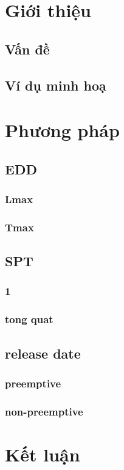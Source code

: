 \documentclass[12pt,a4paper]{report}
\begin{document}
\chapter{Giới thiệu}
\section{Vấn đề}
\section{Ví dụ minh hoạ}
\chapter{Phương pháp}
\section{EDD}
\subsection{Lmax}
\subsection{Tmax}
\section{SPT}
\subsection{1}
\subsection{tong quat}
\section{release date}
\subsection{preemptive}
\subsection{non-preemptive}
\chapter{Kết luận}
\end{document}
